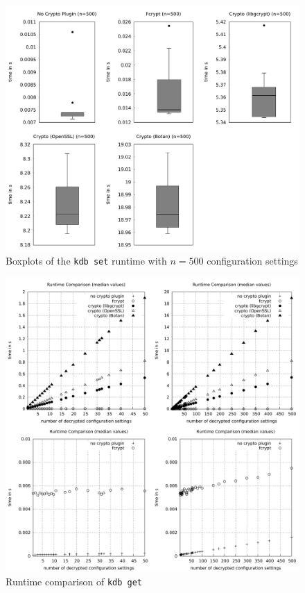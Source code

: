 \begin{figure}[h]
\center
\caption{Boxplots of the \texttt{kdb set} runtime with $n = 500$ configuration settings}
\label{eval-boxplot-set}
\includegraphics[width=\columnwidth]{plots/boxplot_500_set.pdf}
\end{figure}


\begin{figure}[h]
\center
\caption{Runtime comparison of \texttt{kdb get}}
\label{eval-runtime-comp-get}
\includegraphics[width=\columnwidth]{plots/comp_median_get.pdf}
\end{figure}

